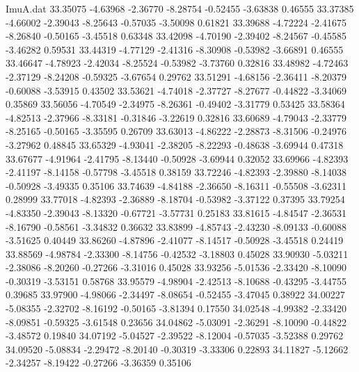 \begin{filecontents}{ImuA.dat}
  33.35075   -4.63968   -2.36770   -8.28754   -0.52455   -3.63838    0.46555
  33.37385   -4.66002   -2.39043   -8.25643   -0.57035   -3.50098    0.61821
  33.39688   -4.72224   -2.41675   -8.26840   -0.50165   -3.45518    0.63348
  33.42098   -4.70190   -2.39402   -8.24567   -0.45585   -3.46282    0.59531
  33.44319   -4.77129   -2.41316   -8.30908   -0.53982   -3.66891    0.46555
  33.46647   -4.78923   -2.42034   -8.25524   -0.53982   -3.73760    0.32816
  33.48982   -4.72463   -2.37129   -8.24208   -0.59325   -3.67654    0.29762
  33.51291   -4.68156   -2.36411   -8.20379   -0.60088   -3.53915    0.43502
  33.53621   -4.74018   -2.37727   -8.27677   -0.44822   -3.34069    0.35869
  33.56056   -4.70549   -2.34975   -8.26361   -0.49402   -3.31779    0.53425
  33.58364   -4.82513   -2.37966   -8.33181   -0.31846   -3.22619    0.32816
  33.60689   -4.79043   -2.33779   -8.25165   -0.50165   -3.35595    0.26709
  33.63013   -4.86222   -2.28873   -8.31506   -0.24976   -3.27962    0.48845
  33.65329   -4.93041   -2.38205   -8.22293   -0.48638   -3.69944    0.47318
  33.67677   -4.91964   -2.41795   -8.13440   -0.50928   -3.69944    0.32052
  33.69966   -4.82393   -2.41197   -8.14158   -0.57798   -3.45518    0.38159
  33.72246   -4.82393   -2.39880   -8.14038   -0.50928   -3.49335    0.35106
  33.74639   -4.84188   -2.36650   -8.16311   -0.55508   -3.62311    0.28999
  33.77018   -4.82393   -2.36889   -8.18704   -0.53982   -3.37122    0.37395
  33.79254   -4.83350   -2.39043   -8.13320   -0.67721   -3.57731    0.25183
  33.81615   -4.84547   -2.36531   -8.16790   -0.58561   -3.34832    0.36632
  33.83899   -4.85743   -2.43230   -8.09133   -0.60088   -3.51625    0.40449
  33.86260   -4.87896   -2.41077   -8.14517   -0.50928   -3.45518    0.24419
  33.88569   -4.98784   -2.33300   -8.14756   -0.42532   -3.18803    0.45028
  33.90930   -5.03211   -2.38086   -8.20260   -0.27266   -3.31016    0.45028
  33.93256   -5.01536   -2.33420   -8.10090   -0.30319   -3.53151    0.58768
  33.95579   -4.98904   -2.42513   -8.10688   -0.43295   -3.44755    0.39685
  33.97900   -4.98066   -2.34497   -8.08654   -0.52455   -3.47045    0.38922
  34.00227   -5.08355   -2.32702   -8.16192   -0.50165   -3.81394    0.17550
  34.02548   -4.99382   -2.33420   -8.09851   -0.59325   -3.61548    0.23656
  34.04862   -5.03091   -2.36291   -8.10090   -0.44822   -3.48572    0.19840
  34.07192   -5.04527   -2.39522   -8.12004   -0.57035   -3.52388    0.29762
  34.09520   -5.08834   -2.29472   -8.20140   -0.30319   -3.33306    0.22893
  34.11827   -5.12662   -2.34257   -8.19422   -0.27266   -3.36359    0.35106

\end{filecontents}
